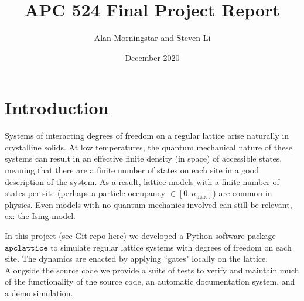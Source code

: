 \documentclass{article}
\title{APC 524 Final Project Report}
\author{Alan Morningstar and Steven Li}
\date{December 2020}
\begin{document}
\maketitle

\section{Introduction}

Systems of interacting degrees of freedom on a regular lattice arise naturally in crystalline solids. At low temperatures, the quantum mechanical nature of these systems can result in an effective finite density (in space) of accessible states, meaning that there are a finite number of states on each site in a good description of the system. As a result, lattice models with a finite number of states per site (perhaps a particle occupancy $\in [0, n_\mathrm{max}]$) are common in physics. Even models with no quantum mechanics involved can still be relevant, ex: the Ising model.

In this project (see Git repo \href{http://www.github.com/aormorningstar/apclattice}{here}) we developed a Python software package $\texttt{apclattice}$ to simulate regular lattice systems with degrees of freedom on each site. The dynamics are enacted by applying ``gates" locally on the lattice. Alongside the source code we provide a suite of tests to verify and maintain much of the functionality of the source code, an automatic documentation system, and a demo simulation.
\end{document}
